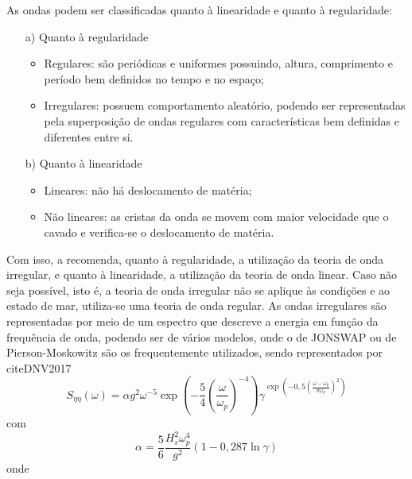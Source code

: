 As ondas podem ser classificadas quanto à linearidade e quanto à regularidade:
\begin{itemize}
	\item[a)] Quanto à regularidade
	\begin{itemize}
		\item Regulares: são periódicas e uniformes possuindo, altura, comprimento e período bem definidos no tempo e no espaço;

		\item Irregulares: possuem comportamento aleatório, podendo ser representadas pela superposição de ondas regulares com características bem definidas e diferentes entre si.
	\end{itemize}

	\item[b)] Quanto à linearidade

	\begin{itemize}
		\item Lineares: não há deslocamento de matéria;
		\item Não lineares: as cristas da onda se movem com maior velocidade que o cavado e verifica-se o deslocamento de matéria.
	\end{itemize}
\end{itemize}

Com isso, a  recomenda, quanto à regularidade, a utilização da teoria de onda irregular, e quanto à linearidade, a utilização da teoria de onda linear.
Caso não seja possível, isto é, a teoria de onda irregular não se aplique às condições e ao estado de mar, utiliza-se uma teoria de onda regular.
As ondas irregulares são representadas por meio de um espectro que descreve a energia em função da frequência de onda, podendo ser de vários modelos, onde o de JONSWAP ou de Pierson-Moskowitz são os frequentemente utilizados, sendo representados por cite{DNV2017}
\begin{equation}
\label{eq:jdsn-eq2}
S_{\eta\eta}(\omega) = \alpha g^2 \omega^{-5} \exp\left(-\frac{5}{4}\left(\frac{\omega}{\omega_p}\right)^{-4}\right)\gamma^{\exp \left(-0,5\left(\frac{\omega-\omega_p}{\sigma \omega_p}\right)^2\right)}
\end{equation}
com
\begin{equation}
\label{eq:jdsn-eq3}
\alpha = \frac{5}{6} \frac{H_s^2 \omega_p^4}{g^2} \left(1- 0,287 \ln{\gamma}\right)
\end{equation}
onde

